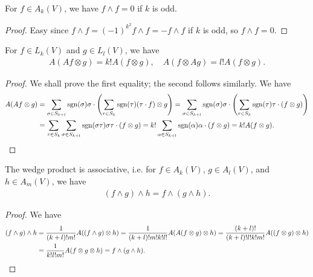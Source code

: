 \begin{corollary}
    For $f \in A_{k}(V)$, we have $f \wedge f = 0$ if $k$ is odd.
\end{corollary}
\begin{proof}
    Easy since $f \wedge f = (-1)^{k^{2}} f \wedge f = -f \wedge f$ if $k$ is odd, so $f \wedge f = 0$.
\end{proof}

\begin{lemma}
    For $f \in L_{k}(V)$ and $g \in L_{l}(V)$, we have
    \begin{align}
        A(Af \otimes g) = k!A(f \otimes g), \quad A(f \otimes Ag) = l!A(f \otimes g).
    \end{align}
\end{lemma}

\begin{proof}
    We shall prove the first equality; the second follows similarly. We have
    \begin{align}
        A(Af \otimes g) &= \sum_{\sigma \in S_{k+l}} \operatorname{sgn}(\sigma) \sigma \cdot \left( \sum_{\tau \in S_{k}} \operatorname{sgn}(\tau) (\tau \cdot f)  \otimes g \right) = \sum_{\sigma \in S_{k+l}} \operatorname{sgn}(\sigma) \sigma \cdot \left( \sum_{\tau \in S_{k}} \operatorname{sgn}(\tau) \tau \cdot(f \otimes g) \right) \notag \\
        &= \sum_{\tau \in S_{k}} \sum_{\sigma \in S_{k+l}} \operatorname{sgn}(\sigma \tau) \sigma \tau \cdot (f \otimes g) = k! \sum_{\alpha \in S_{k+l}} \operatorname{sgn}(\alpha) \alpha \cdot (f \otimes g) = k! A(f \otimes g).
    \end{align}
\end{proof}

\begin{proposition}
    The wedge product is associative, i.e. for $f \in A_{k}(V)$, $g \in A_{l}(V)$, and $h \in A_{m}(V)$, we have
    \begin{align}
        (f \wedge g) \wedge h = f \wedge (g \wedge h).
    \end{align}
\end{proposition}
\begin{proof}
    We have
    \begin{align}
        (f \wedge g) \wedge h &= \frac{1}{(k+l)!m!} A((f \wedge g) \otimes h) = \frac{1}{(k+l)!m!k!l!} A(A(f \otimes g) \otimes h) = \frac{(k+l)!}{(k+l)!l!k!m!}A((f \otimes g) \otimes h) \notag \\
        &= \frac{1}{k!l!m!} A(f \otimes g \otimes h) = f \wedge (g \wedge h).
    \end{align}
\end{proof}

